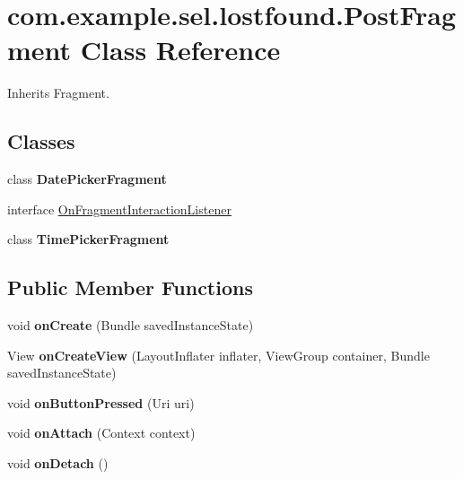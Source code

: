 \hypertarget{classcom_1_1example_1_1sel_1_1lostfound_1_1PostFragment}{\section{com.\-example.\-sel.\-lostfound.\-Post\-Fragment \-Class \-Reference}
\label{classcom_1_1example_1_1sel_1_1lostfound_1_1PostFragment}
}


\-Inherits \-Fragment.

\subsection*{\-Classes}
\begin{DoxyCompactItemize}
\item 
class {\bfseries \-Date\-Picker\-Fragment}
\item 
interface \hyperlink{interfacecom_1_1example_1_1sel_1_1lostfound_1_1PostFragment_1_1OnFragmentInteractionListener}{\-On\-Fragment\-Interaction\-Listener}
\item 
class {\bfseries \-Time\-Picker\-Fragment}
\end{DoxyCompactItemize}
\subsection*{\-Public \-Member \-Functions}
\begin{DoxyCompactItemize}
\item 
\hypertarget{classcom_1_1example_1_1sel_1_1lostfound_1_1PostFragment_a6ae53f1d4250edd39b3fab572b34a03c}{void {\bfseries on\-Create} (\-Bundle saved\-Instance\-State)}\label{classcom_1_1example_1_1sel_1_1lostfound_1_1PostFragment_a6ae53f1d4250edd39b3fab572b34a03c}

\item 
\hypertarget{classcom_1_1example_1_1sel_1_1lostfound_1_1PostFragment_a8c10184073835d28affa07720db256a4}{\-View {\bfseries on\-Create\-View} (\-Layout\-Inflater inflater, \-View\-Group container, \-Bundle saved\-Instance\-State)}\label{classcom_1_1example_1_1sel_1_1lostfound_1_1PostFragment_a8c10184073835d28affa07720db256a4}

\item 
\hypertarget{classcom_1_1example_1_1sel_1_1lostfound_1_1PostFragment_afba287683734ca9acaea52278c3e1eb5}{void {\bfseries on\-Button\-Pressed} (\-Uri uri)}\label{classcom_1_1example_1_1sel_1_1lostfound_1_1PostFragment_afba287683734ca9acaea52278c3e1eb5}

\item 
\hypertarget{classcom_1_1example_1_1sel_1_1lostfound_1_1PostFragment_af8646c233bb3c70dbb6352f8a1c60e62}{void {\bfseries on\-Attach} (\-Context context)}\label{classcom_1_1example_1_1sel_1_1lostfound_1_1PostFragment_af8646c233bb3c70dbb6352f8a1c60e62}

\item 
\hypertarget{classcom_1_1example_1_1sel_1_1lostfound_1_1PostFragment_ae96f353335b113be26870d00d3ac3b1c}{void {\bfseries on\-Detach} ()}\label{classcom_1_1example_1_1sel_1_1lostfound_1_1PostFragment_ae96f353335b113be26870d00d3ac3b1c}

\end{DoxyCompactItemize}

